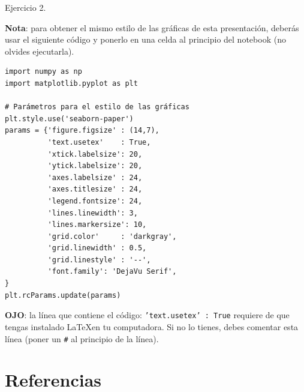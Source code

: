 \documentclass{beamer}
\begin{document}
\begin{frame}[fragile]
	
{\small 
\begin{exampleblock}{Ejercicio 2.}

\textbf{Nota}: para obtener el mismo estilo de las gráficas de esta presentación, 
deberás usar el siguiente código y ponerlo en una celda al principio del notebook (no olvides ejecutarla).

\begin{lstlisting}
import numpy as np
import matplotlib.pyplot as plt

# Parámetros para el estilo de las gráficas
plt.style.use('seaborn-paper')
params = {'figure.figsize' : (14,7),
          'text.usetex'    : True,
          'xtick.labelsize': 20,
          'ytick.labelsize': 20,
          'axes.labelsize' : 24,
          'axes.titlesize' : 24,
          'legend.fontsize': 24,
          'lines.linewidth': 3,
          'lines.markersize': 10,
          'grid.color'     : 'darkgray',
          'grid.linewidth' : 0.5,
          'grid.linestyle' : '--',
          'font.family': 'DejaVu Serif',
}
plt.rcParams.update(params)
\end{lstlisting}
{\tiny \textbf{OJO}: la línea que contiene el código: \texttt{'text.usetex' : True} requiere de que tengas instalado
\LaTeX en tu computadora. Si no lo tienes, debes comentar esta línea (poner un \texttt{\#} al principio de la línea).}
\end{exampleblock}
}
\end{frame}

\section<presentation>{Referencias}
\end{document}
